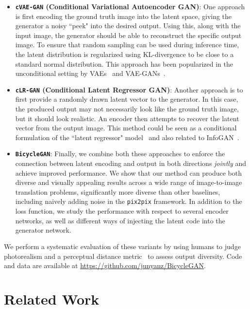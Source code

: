 \begin{itemize}[leftmargin=0.1in]

    \item \textbf{\texttt{cVAE-GAN} (Conditional Variational Autoencoder GAN)}: One approach is first encoding the ground truth image into the latent space, giving the generator a noisy ``peek" into the desired output. Using this, along with the input image, the generator should be able to reconstruct the specific output image. To ensure that random sampling can be used during inference time, the latent distribution is regularized using KL-divergence to be close to a standard normal distribution. This approach has been popularized in the unconditional setting by VAEs~\citep{kingma2013auto} and VAE-GANs~\citep{larsen2016vaegan}.

    \item \textbf{\texttt{cLR-GAN} (Conditional Latent Regressor GAN)}: Another approach is to first provide a randomly drawn latent vector to the generator. In this case, the produced output may not necessarily look like the ground truth image, but it should look realistic. An encoder then attempts to recover the latent vector from the output image. This method could be seen as a conditional formulation of the ``latent regressor" model~\citep{donahue2016adversarial,dumoulin2016adversarially} and also related to InfoGAN~\citep{xi2016infogan}.

    \item \textbf{\texttt{BicycleGAN}}: Finally, we combine both these approaches to enforce the connection between latent encoding and output in both directions {\em jointly} and achieve improved performance. We show that our method can produce both diverse and visually appealing results across a wide range of image-to-image translation problems, significantly more diverse than other baselines, including naively adding noise in the \texttt{pix2pix} framework. In addition to the loss function, we study the performance with respect to several encoder networks, as well as different ways of injecting the latent code into the generator network. 
\end{itemize}

We perform a systematic evaluation of these variants by using humans to judge photorealism and a perceptual distance metric~\cite{zhang2018unreasonable} to assess output diversity. Code and data are available at \url{https://github.com/junyanz/BicycleGAN}.

\section{Related Work}

